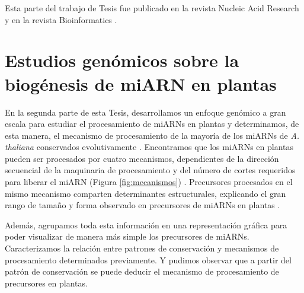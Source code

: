 Esta parte del trabajo de Tesis fue publicado en la revista Nucleic Acid Research \citep{Chorostecki05072012} y en la revista Bioinformatics \citep{Chorostecki2014}.



\section{Estudios genómicos sobre la biogénesis de miARN en plantas}

En la segunda parte de esta Tesis, desarrollamos un enfoque genómico a gran escala para estudiar el procesamiento de miARNs en plantas y determinamos, de esta manera, el mecanismo de procesamiento de la mayoría de los miARNs de \textit{A. thaliana} conservados evolutivamente \citep{Bologna2013}.
Encontramos que los miARNs en plantas pueden ser procesados por cuatro mecanismos, dependientes de la dirección secuencial de la maquinaria de procesamiento y del número de cortes requeridos para liberar el miARN (Figura \ref{fig:mecanismos}) \citep{Bologna2013}.
Precursores procesados en el mismo mecanismo comparten determinantes estructurales, explicando el gran rango de tamaño y forma observado en precursores de miARNs en plantas \citep{Bologna2013}.

Además, agrupamos toda esta información en una representación gráfica para poder visualizar de manera más simple los precursores de miARNs. 
Caracterizamos la relación entre patrones de conservación y mecanismos de procesamiento determinados previamente. 
Y pudimos observar que a partir del patrón de conservación se puede deducir el mecanismo de procesamiento de precursores en plantas.
